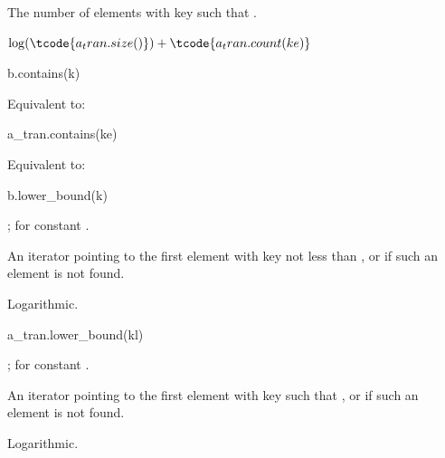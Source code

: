 \begin{itemdescr}
\pnum
\result
{}

\pnum
\returns
The number of elements with key 
such that .

\pnum
\complexity
$\log (\tcode{a_tran.size()}) + \tcode{a_tran.count(ke)}$
\end{itemdescr}

%
\begin{itemdecl}
b.contains(k)
\end{itemdecl}

\begin{itemdescr}
\pnum
\result
{}

\pnum
\effects
Equivalent to: 
\end{itemdescr}

%
\begin{itemdecl}
a_tran.contains(ke)
\end{itemdecl}

\begin{itemdescr}
\pnum
\result
{}

\pnum
\effects
Equivalent to: 
\end{itemdescr}

%
\begin{itemdecl}
b.lower_bound(k)
\end{itemdecl}

\begin{itemdescr}
\pnum
\result
{};  for constant .

\pnum
\returns
An iterator pointing to the first element with key not less than ,
or  if such an element is not found.

\pnum
\complexity
Logarithmic.
\end{itemdescr}

%
\begin{itemdecl}
a_tran.lower_bound(kl)
\end{itemdecl}

\begin{itemdescr}
\pnum
\result
{};  for constant .

\pnum
\returns
An iterator pointing to the first element with key 
such that ,
or  if such an element is not found.

\pnum
\complexity
Logarithmic.
\end{itemdescr}

